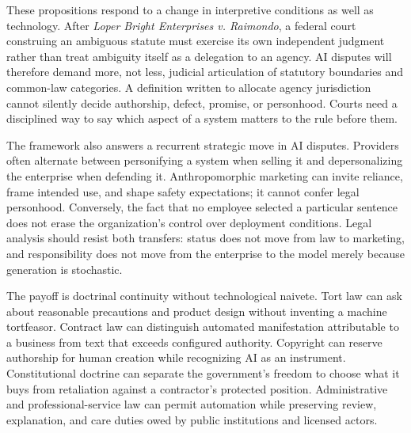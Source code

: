 These propositions respond to a change in interpretive conditions as well as technology. After \emph{Loper Bright Enterprises v. Raimondo}, a federal court construing an ambiguous statute must exercise its own independent judgment rather than treat ambiguity itself as a delegation to an agency. AI disputes will therefore demand more, not less, judicial articulation of statutory boundaries and common-law categories. A definition written to allocate agency jurisdiction cannot silently decide authorship, defect, promise, or personhood. Courts need a disciplined way to say which aspect of a system matters to the rule before them.

The framework also answers a recurrent strategic move in AI disputes. Providers often alternate between personifying a system when selling it and depersonalizing the enterprise when defending it. Anthropomorphic marketing can invite reliance, frame intended use, and shape safety expectations; it cannot confer legal personhood. Conversely, the fact that no employee selected a particular sentence does not erase the organization's control over deployment conditions. Legal analysis should resist both transfers: status does not move from law to marketing, and responsibility does not move from the enterprise to the model merely because generation is stochastic.

The payoff is doctrinal continuity without technological naivete. Tort law can ask about reasonable precautions and product design without inventing a machine tortfeasor. Contract law can distinguish automated manifestation attributable to a business from text that exceeds configured authority. Copyright can reserve authorship for human creation while recognizing AI as an instrument. Constitutional doctrine can separate the government's freedom to choose what it buys from retaliation against a contractor's protected position. Administrative and professional-service law can permit automation while preserving review, explanation, and care duties owed by public institutions and licensed actors.

